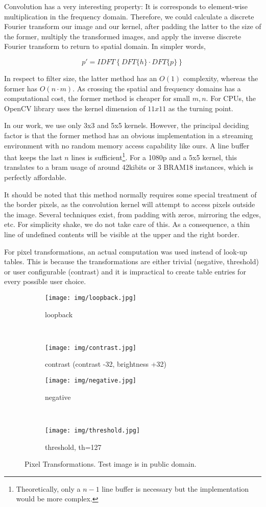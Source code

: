 Convolution has a very interesting property: It is corresponds to element-wise multiplication
in the frequency domain. Therefore, we could calculate a discrete Fourier
transform our image and our kernel, after padding the latter to the size of the former,
multiply the transformed images, and apply the inverse discrete Fourier transform
to return to spatial domain. In simpler words,

\[
	p' = IDFT\left\{ DFT\{h\} \cdot DFT\{p\} \right\}
\]

In respect to filter size, the latter method has an $O(1)$ complexity, 
whereas the former has $O(n\cdot m)$. As crossing the spatial and frequency domains
has a computational cost, the former method is cheaper for small $m,n$.
For CPUs, the OpenCV library uses the kernel dimension of $11x11$ as the turning point.

In our work, we use only 3x3 and 5x5 kernels. However, the principal deciding factor
is that the former method has an obvious implementation in a streaming environment
with no random memory access capability like ours. A line buffer that keeps the last $n$ lines
is sufficient\footnote{Theoretically, only a $n-1$ line buffer is necessary but the
implementation would be more complex.}. For a 1080p and a 5x5 kernel, this translates
to a \gls{bram} usage of around 42kibits or 3 BRAM18 instances, which is perfectly affordable.

It should be noted that this method normally requires some special treatment of the
border pixels, as the convolution kernel will attempt to access pixels outside the image.
Several techniques exist, from padding with zeros, mirroring the edges, etc.
For simplicity shake, we do not take care of this. As a consequence, a thin line 
of undefined contents will be visible at the upper and the right border.

For pixel transformations, an actual computation was used instead of look-up tables.
This is because the transformations are either trivial (negative, threshold) or
user configurable (contrast) and it is impractical to create table entries for every possible
user choice.

\begin{figure}[tb!]
\centering
\begin{subfigure}[b]{.49\linewidth}
	\texttt{[image: img/loopback.jpg]}
	\caption{loopback}
\end{subfigure}
~
\begin{subfigure}[b]{.49\linewidth}
	\texttt{[image: img/contrast.jpg]}
	\caption{contrast (contrast -32, brightness +32)}
\end{subfigure}
\par\bigskip
\begin{subfigure}[b]{.49\linewidth}
	\texttt{[image: img/negative.jpg]}
	\caption{negative}
\end{subfigure}
~
\begin{subfigure}[b]{.49\linewidth}
	\texttt{[image: img/threshold.jpg]}
	\caption{threshold, th=127}
\end{subfigure}
\caption{Pixel Transformations. Test image is in public domain.}
\label{fig:pixel-transformations}
\end{figure}

